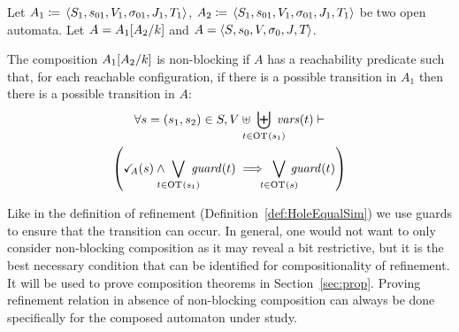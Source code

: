 \documentclass[runningheads]{llncs}
\begin{document}
%
\begin{definition} \label{Def:Non-block}
Let \(A_1 \defobject \OAg[1]\), \( A_2 \defobject \OAg[1]\) be two open automata.
Let \(A = A_1{\left[A_2\middle/k\right]}\) and $A= \left<S_{},s_{0},V_{},\sigma_{0},J_{},T_{}\right>$. 

The composition \(A_1{\left[A_2\middle/k\right]}\) is non-blocking if   \(A \) has a reachability predicate such that, for each reachable configuration, if there is a possible transition in \(A_1\) then there is a possible transition in \(A\):
\begin{multline*}
 \forall s = \mpar{s_1, s_2} \in S, V \uplus \biguplus_\subbox{t \in \fOT{s_1}} \fvars{t} \vdash \\ \left(\reach{A}\mpar{s} \wedge \bigvee_\subbox{t \in \fOT{s_1}} \fguard{t} \implies \bigvee_\subbox{t \in \fOT{s}} \fguard{t} \right)
\end{multline*}
\end{definition}
Like in the definition of refinement (Definition~\ref{def:HoleEqualSim}) we use guards to ensure that the transition can occur. 
In general, one would not want to only consider non-blocking composition as it may reveal a bit restrictive, but it is the best necessary condition that can be identified for compositionality of refinement. It will be used to prove composition theorems in  Section~\ref{sec:prop}. 
Proving refinement relation in absence of non-blocking composition can always be done specifically for the composed automaton under study.
\end{document}
